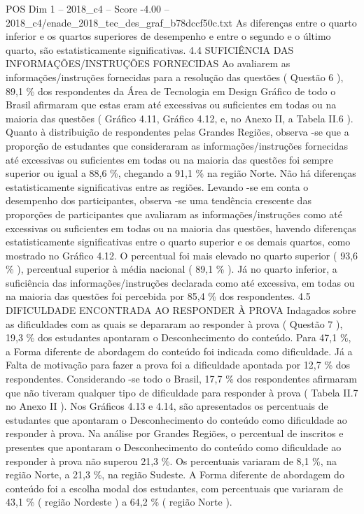 \begin{textsample}{POS Dim 1 – 2018\_c4 – Score -4.00 – 2018\_c4/enade\_2018\_tec\_des\_graf\_b78dccf50c.txt}
As diferenças entre o quarto inferior e os quartos superiores de desempenho e entre o segundo e o último quarto, são estatisticamente significativas. 4.4 SUFICIÊNCIA DAS INFORMAÇÕES/INSTRUÇÕES FORNECIDAS Ao avaliarem as informações/instruções fornecidas para a resolução das questões ( Questão 6 ), 89,1 \% dos respondentes da Área de Tecnologia em Design Gráfico de todo o Brasil afirmaram que estas eram até excessivas ou suficientes em todas ou na maioria das questões ( Gráfico 4.11, Gráfico 4.12, e, no Anexo II, a Tabela II.6 ).
Quanto à distribuição de respondentes pelas Grandes Regiões, observa -se que a proporção de estudantes que consideraram as informações/instruções fornecidas até excessivas ou suficientes em todas ou na maioria das questões foi sempre superior ou igual a 88,6 \%, chegando a 91,1 \% na região Norte.
Não há diferenças estatisticamente significativas entre as regiões.
Levando -se em conta o desempenho dos participantes, observa -se uma tendência crescente das proporções de participantes que avaliaram as informações/instruções como até excessivas ou suficientes em todas ou na maioria das questões, havendo diferenças estatisticamente significativas entre o quarto superior e os demais quartos, como mostrado no Gráfico 4.12.
O percentual foi mais elevado no quarto superior ( 93,6 \% ), percentual superior à média nacional ( 89,1 \% ).
Já no quarto inferior, a suficiência das informações/instruções declarada como até excessiva, em todas ou na maioria das questões foi percebida por 85,4 \% dos respondentes. 4.5 DIFICULDADE ENCONTRADA AO RESPONDER À PROVA Indagados sobre as dificuldades com as quais se depararam ao responder à prova ( Questão 7 ), 19,3 \% dos estudantes apontaram o Desconhecimento do conteúdo.
Para 47,1 \%, a Forma diferente de abordagem do conteúdo foi indicada como dificuldade.
Já a Falta de motivação para fazer a prova foi a dificuldade apontada por 12,7 \% dos respondentes.
Considerando -se todo o Brasil, 17,7 \% dos respondentes afirmaram que não tiveram qualquer tipo de dificuldade para responder à prova ( Tabela II.7 no Anexo II ).
Nos Gráficos 4.13 e 4.14, são apresentados os percentuais de estudantes que apontaram o Desconhecimento do conteúdo como dificuldade ao responder à prova.
Na análise por Grandes Regiões, o percentual de inscritos e presentes que apontaram o Desconhecimento do conteúdo como dificuldade ao responder à prova não superou 21,3 \%.
Os percentuais variaram de 8,1 \%, na região Norte, a 21,3 \%, na região Sudeste.
A Forma diferente de abordagem do conteúdo foi a escolha modal dos estudantes, com percentuais que variaram de 43,1 \% ( região Nordeste ) a 64,2 \% ( região Norte ).

\end{textsample}
